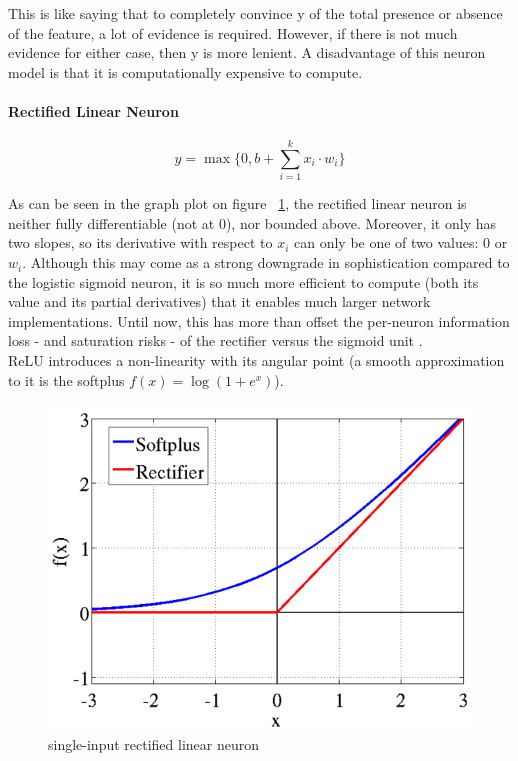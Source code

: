 \documentclass[a4paper,11pt]{article}
\begin{document}
This is like saying that to completely convince y of the total presence or absence of the feature, a lot of evidence is required. However, if there is not much evidence for either case, then y is more lenient. 
A disadvantage of this neuron model is that it is computationally expensive to compute.
                
\paragraph{Rectified Linear Neuron}
\begin{equation}
\label{relu}
y = \max\{0, b + \sum\limits_{i=1}^k x_{i}\cdot w_{i}\}
\end{equation}

As can be seen in the graph plot on figure ~\ref{f10}, the rectified linear neuron is neither fully differentiable (not at $0$), nor bounded above. Moreover, it only has two slopes, so its derivative with respect to $x_{i}$ can only be one of two values: $0$ or $w_{i}$. Although this may come as a strong downgrade in sophistication compared to the logistic sigmoid neuron, it is so much more efficient to compute (both its value and its partial derivatives) that it enables much larger network implementations\cite{krizhevsky}. Until now, this has more than offset the per-neuron information loss - and saturation risks - of the rectifier versus the sigmoid unit \cite{rectifier}. \\

ReLU introduces a non-linearity with its angular point (a smooth approximation to it is the softplus $f(x) = \log(1 + e^x)$). \\


\begin{figure}[h!]
	\centering
	\includegraphics[scale=0.3]{images/rectifier.png}
	\caption{single-input rectified linear neuron}
    \label{f10}
\end{figure}
\end{document}
